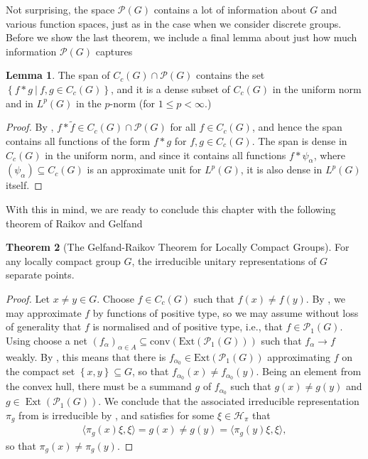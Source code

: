 \documentclass[10pt,twoside,openany,final]{memoir}
\theoremstyle{definition}
\newtheorem{theorem}{Theorem}[chapter]
\newtheorem{lemma}[theorem]{Lemma}
\theoremstyle{Break}
\renewcommand{\H}{\mathcal{H}}
\renewcommand{\P}{\mathcal{P}}
\DeclareMathOperator{\Ext}{Ext}
\begin{document}
Not surprising, the space $\P(G)$ contains a lot of information about $G$ and various function spaces, just as in the case when we consider discrete groups. Before we show the last theorem, we include a final lemma about just how much information $\P(G)$ captures
\begin{lemma}
	The span of $C_c(G) \cap \P(G)$ contains the set $\left\{ f \ast g \ \big| \ f,g \in C_c(G) \right\}$, and it is a dense subset of $C_c(G)$ in the uniform norm and in $L^p(G)$ in the $p$-norm (for $1 \leq p < \infty$.)
	\label{3.33}
\end{lemma}
\begin{proof}
	By , $f \ast\tilde{f} \in C_c(G) \cap \P(G) $ for all $f \in C_c(G)$, and hence the span contains all functions of the form $f \ast g$ for $f,g \in C_c(G)$. The span is dense in $C_c(G)$ in the uniform norm, and since it contains all functions $f \ast \psi_\alpha$, where $(\psi_\alpha)\subseteq C_c(G)$ is an approximate unit for $L^p(G)$, it is also dense in $L^p(G)$ itself.
\end{proof}

With this in mind, we are ready to conclude this chapter with the following theorem of Raikov and Gelfand
\begin{theorem}[The Gelfand-Raikov Theorem for Locally Compact Groups]
	For any locally compact group $G$, the irreducible unitary representations of $G$ separate points.
	\label{3.34}
\end{theorem}
\begin{proof}
	Let $x\neq y \in G$. Choose $f \in C_c(G)$ such that $f(x)\neq f(y)$. By , we may approximate $f$ by functions of positive type, so we may assume without loss of generality that $f$ is normalised and of positive type, i.e., that $f \in \P_1(G)$. Using  choose a net $(f_\alpha)_{\alpha \in A} \subseteq \mathrm{conv}(\mathrm{Ext}(\P_1(G)))$ such that $f_\alpha \to f$ weakly. By , this means that there is $f_{\alpha_0} \in \mathrm{Ext}(\P_1(G))$ approximating $f$ on the compact set $\left\{ x,y \right\}\subseteq G$, so that $f_{\alpha_0}(x) \neq f_{\alpha_0}(y)$. Being an element from the convex hull, there must be a summand $g$ of $f_{\alpha_0}$ such that $g(x) \neq g(y)$ and $g \in \Ext(\P_1(G))$. We conclude that the associated irreducible representation $\pi_{g}$ from  is irreducible by , and satisfies for some $\xi \in \H_\pi$ that
	\begin{align*}
		\langle \pi_g(x) \xi , \xi \rangle =g(x) \neq g(y) = \langle \pi_g(y) \xi,\xi\rangle,
	\end{align*}
	so that $\pi_g(x)\neq \pi_g(y)$.
\end{proof}
\end{document}
